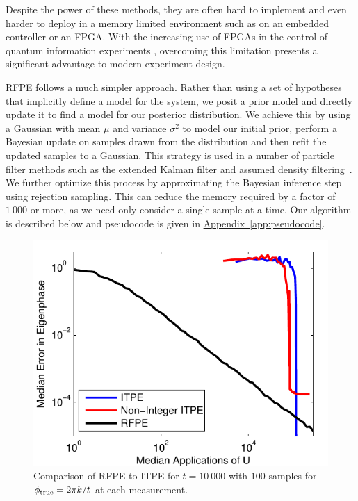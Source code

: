 \documentclass[aps,pra,amsmath,twocolumn,amssymb,superscriptaddress]{revtex4-1}
\newcommand{\app}[1]{\hyperref[app:#1]{Appendix~\ref*{app:#1}}}
\begin{document}
Despite the power of these methods, they are often hard to implement and even
harder to deploy in a memory limited environment such as on an embedded
controller or an FPGA. With the increasing use of FPGAs in the control of
quantum information experiments
\cite{shulman_suppressing_2014,casagrande_design_2014,hornibrook_cryogenic_2015},
overcoming this limitation presents a
significant advantage to modern experiment design. 

RFPE follows a much simpler approach. Rather than using a set of hypotheses that implicitly
define a model for the system, we posit a prior model and directly update it
to find a model for our posterior distribution.  We achieve this by using a
Gaussian with mean $\mu$ and variance $\sigma^2$ to model our initial prior, perform a Bayesian update on samples
drawn from the distribution and then refit the updated samples to a Gaussian.
This strategy is used in a number of particle filter methods such as the extended Kalman filter and assumed density
filtering~\cite{haykin2004kalman,opper1998bayesian}.  We further optimize
this process by approximating the Bayesian inference step using rejection
sampling.  This can reduce the memory required by a factor of $1~000$ or more,
as we need only consider a single sample at a time. Our algorithm is described
below and pseudocode is given in \app{pseudocode}.

\begin{figure}[t!]
    \begin{centering}
        \includegraphics[width=0.723\linewidth]{ITPEcmp.pdf}
    \end{centering}
    \caption{\label{fig:ITPEcmp}
     Comparison of RFPE to ITPE for $t=10~000$ with $100$ samples for $\phi_{\rm true} = 2\pi k/t$ at each measurement.  
    }
\end{figure}
\end{document}
